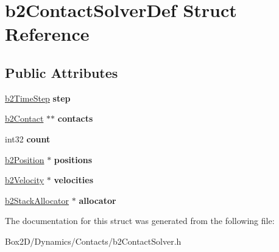 \hypertarget{structb2_contact_solver_def}{}\section{b2\+Contact\+Solver\+Def Struct Reference}
\label{structb2_contact_solver_def}
\subsection*{Public Attributes}
\begin{DoxyCompactItemize}
\item 
\mbox{\label{structb2_contact_solver_def_a544604c01e6606ab54b8ccd5289a7ac7}} 
\hyperlink{structb2_time_step}{b2\+Time\+Step} {\bfseries step}
\item 
\mbox{\label{structb2_contact_solver_def_a4b9d708e3122cab8d9dabeafefc7a9af}} 
\hyperlink{classb2_contact}{b2\+Contact} $\ast$$\ast$ {\bfseries contacts}
\item 
\mbox{\label{structb2_contact_solver_def_ae977ea1cee4b7b9ee99210d9b66f88ea}} 
int32 {\bfseries count}
\item 
\mbox{\label{structb2_contact_solver_def_aaf1432d040aa6279d91d8c9f24a4728a}} 
\hyperlink{structb2_position}{b2\+Position} $\ast$ {\bfseries positions}
\item 
\mbox{\label{structb2_contact_solver_def_ae839e5c5464aa54c1ad8ce1634b49a1f}} 
\hyperlink{structb2_velocity}{b2\+Velocity} $\ast$ {\bfseries velocities}
\item 
\mbox{\label{structb2_contact_solver_def_a54198ac9886a988b9ffd06cf28c4c45c}} 
\hyperlink{classb2_stack_allocator}{b2\+Stack\+Allocator} $\ast$ {\bfseries allocator}
\end{DoxyCompactItemize}


The documentation for this struct was generated from the following file\+:\begin{DoxyCompactItemize}
\item 
Box2\+D/\+Dynamics/\+Contacts/b2\+Contact\+Solver.\+h\end{DoxyCompactItemize}
